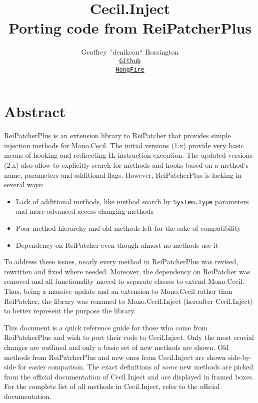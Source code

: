 \documentclass[a4paper,11pt]{article}
\newcommand{\CecilInject}{\textsc{C}{\scriptsize \sc ecil}.\textsc{I}{\scriptsize \sc nject}}
\begin{document}
\title{\textsc{C}{\large \sc ecil}.\textsc{I}{\large \sc nject} \\ \vspace{-10pt} {\Large Porting code from ReiPatcherPlus}}

\author{Geoffrey ''denikson`` Horsington \\
{\normalsize \tt \href{https://github.com/denikson}{Github}} \\
{\normalsize \tt \href{http://www.hongfire.com/forum/member.php/1347954-denikson}{HongFire}}
}
\maketitle
\section{Abstract}
ReiPatcherPlus is an extension library to ReiPatcher that provides simple injection methods for Mono.Cecil. The initial versions (1.x) provide very basic means of hooking and redirecting IL instruction execution. The updated versions (2.x) also allow to explicitly search for methods and hooks based on a method's name, parameters and additional flags. 
However, ReiPatcherPlus is lacking in several ways:
\begin{itemize}
\item Lack of additional methods, like method search by \texttt{System.Type} parameters and more advanced access changing methods
\item Poor method hierarchy and old methods left for the sake of compatibility
\item Dependency on ReiPatcher even though almost no methods use it
\end{itemize}
To address these issues, nearly every method in ReiPatcherPlus was revised, rewritten and fixed where needed. Moreover, the dependency on ReiPatcher was removed and all functionality moved to separate classes to extend Mono.Cecil. Thus, being a massive update and an extension to Mono.Cecil rather than ReiPatcher, the library was renamed to Mono.Cecil.Inject (hereafter \CecilInject{}) to better represent the purpose the library.

This document is a quick reference guide for those who come from ReiPatcherPlus and wish to port their code to \CecilInject{}. Only the most crucial changes are outlined and only a basic set of new methods are shown. Old methods from ReiPatcherPlus and new ones from \CecilInject{} are shown side-by-side for easier comparison. The exact definitions of \emph{some} new methods are picked from the official documentation of \CecilInject{} and are displayed in framed boxes. For the complete list of all methods in \CecilInject{}, refer to the official documentation.
\newpage
\end{document}

